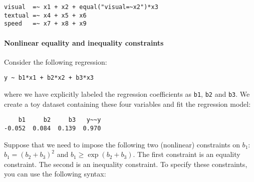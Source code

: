 \begin{verbatim}
visual  =~ x1 + x2 + equal("visual=~x2")*x3
textual =~ x4 + x5 + x6
speed   =~ x7 + x8 + x9
\end{verbatim}

\hypertarget{nonlinear-equality-and-inequality-constraints}{%
\paragraph{Nonlinear equality and inequality
constraints}\label{nonlinear-equality-and-inequality-constraints}}

Consider the following regression:

\begin{verbatim}
y ~ b1*x1 + b2*x2 + b3*x3
\end{verbatim}

where we have explicitly labeled the regression coefficients as
\texttt{b1}, \texttt{b2} and \texttt{b3}. We create a toy dataset
containing these four variables and fit the regression model:

\begin{Shaded}
\begin{Highlighting}[]
\NormalTok{(}\NormalTok{)}
\OtherTok{\textless{}{-}} \NormalTok{(} \NormalTok{(}\NormalTok{), }
                    \NormalTok{(}\NormalTok{), }
                    \NormalTok{(}\NormalTok{),}
                    \NormalTok{(}\NormalTok{))}
\OtherTok{\textless{}{-}} 
\OtherTok{\textless{}{-}} 
\end{Highlighting}
\end{Shaded}

\begin{verbatim}
    b1     b2     b3   y~~y 
-0.052  0.084  0.139  0.970 
\end{verbatim}

Suppose that we need to impose the following two (nonlinear) constraints
on \(b_1\): \(b_1 = (b_2+b_3)^2\) and \(b_1 \geq \exp(b_2 + b_3)\). The
first constraint is an equality constraint. The second is an inequality
constraint. To specify these constraints, you can use the following
syntax:

